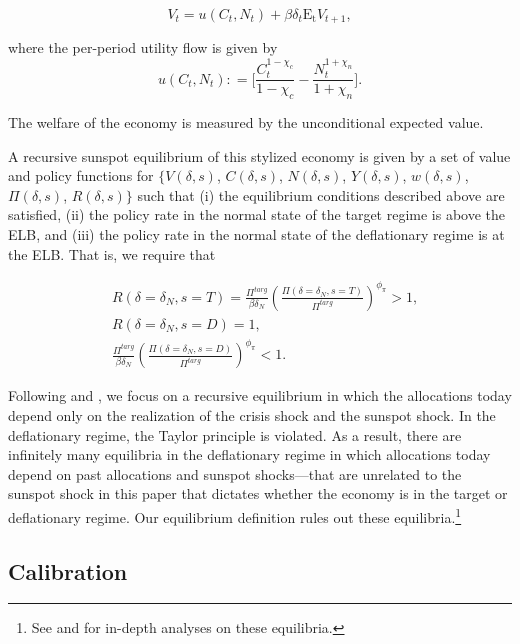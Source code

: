 \documentclass[11pt]{article}
\begin{document}
	\begin{equation}
		V_{t} = u(C_{t},N_{t}) + \beta \delta_{t}\mathrm{E_{t}}V_{t+1},
	\end{equation}

	\noindent where the per-period utility flow is given by
	\begin{equation}
		u(C_{t},N_{t}) : = \Bigg[\frac{C_{t}^{1-\chi_{c}}}{1-\chi_{c}}-\frac{N_{t}^{1+\chi_{n}}}{1+\chi_{n}}\Bigg].
	\end{equation}

	\noindent The welfare of the economy is measured by the unconditional expected value.

	A recursive sunspot equilibrium of this stylized economy is given by a set of value and policy functions for $\{V(\delta,s)$, $C(\delta,s)$, $N(\delta,s)$, $Y(\delta,s)$, $w(\delta,s)$, $\Pi(\delta,s)$, $R(\delta,s)\}$ such that (i) the equilibrium conditions described above are satisfied, (ii) the policy rate in the normal state of the target regime is above the ELB, and (iii) the policy rate in the normal state of the deflationary regime is at the ELB. That is, we require that

	\begin{align}
		& R(\delta=\delta_{N},s=T) = \frac{\Pi^{targ}}{\beta\delta_N}\left(\frac{\Pi(\delta=\delta_{N},s=T)}{\Pi^{targ}}\right)^{\phi_{\pi}} > 1,\\
		& R(\delta=\delta_{N},s=D) = 1,\\
		& \frac{\Pi^{targ}}{\beta\delta_N}\left(\frac{\Pi(\delta=\delta_{N},s=D)}{\Pi^{targ}}\right)^{\phi_{\pi}} < 1.
	\end{align}

	Following \citet{MertensRavn2014} and \citet{AruobaCubaBordaSchorfheide2018}, we focus on a recursive equilibrium in which the allocations today depend only on the realization of the crisis shock and the sunspot shock. In the deflationary regime, the Taylor principle is violated. As a result, there are infinitely many equilibria in the deflationary regime in which allocations today depend on past allocations and sunspot shocks---that are unrelated to the sunspot shock in this paper that dictates whether the economy is in the target or deflationary regime. Our equilibrium definition rules out these equilibria.\footnote{See \citet{Hirose2007} and \citet{HiroseForthcoming} for in-depth analyses on these equilibria.}


	\subsection{Calibration}
	\label{S:Calibration}
\end{document}
